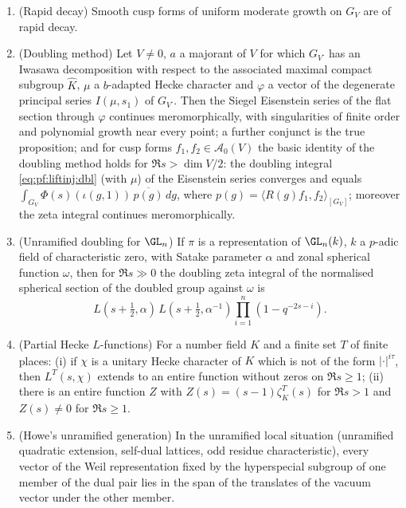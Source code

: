 \begin{littheorem}
\label{pf:liftinj:lit}
\begin{enumerate}[label=(\alph*)]
\item (Rapid decay) Smooth cusp forms of uniform moderate growth on $G_V$ are of rapid decay.
\item (Doubling method) Let $V\ne0$, $a$ a majorant of $V$ for which $G_{V^\square}$ has an Iwasawa decomposition with respect to the
associated maximal compact subgroup $\hat K$, $\mu$ a $b$-adapted Hecke character and $\varphi$ a vector of the degenerate principal
series $I(\mu,s_1)$ of $G_{V^\square}$. Then the Siegel Eisenstein series of the flat section through $\varphi$ continues
meromorphically, with singularities of finite order and polynomial growth near every point; a further conjunct is the true
proposition; and for cusp forms $f_1,f_2\in\mathcal A_0(V)$ the basic identity of the doubling method holds for $\Re s>\dim V/2$: the
doubling integral \eqref{eq:pf:liftinj:dbl} (with $\mu$) of the Eisenstein series converges and equals
$\int_{G_V}\Phi(s)(\iota(g,1))\,\overline{p(g)}\,dg$, where $p(g)=\langle R(g)f_1,f_2\rangle_{[G_V]}$; moreover the zeta integral
continues meromorphically.
\item (Unramified doubling for $\GL_n$) If $\pi$ is a representation of $\GL_n(k)$, $k$ a $p$-adic field of characteristic zero, with
Satake parameter $\alpha$ and zonal spherical function $\omega$, then for $\Re s\gg0$ the doubling zeta integral of the normalised
spherical section of the doubled group against $\omega$ is
\[
L(s+\tfrac12,\alpha)\,L(s+\tfrac12,\alpha^{-1})\prod_{i=1}^{n}(1-q^{-2s-i}).
\]
\item (Partial Hecke $L$-functions) For a number field $K$ and a finite set $T$ of finite places: (i) if $\chi$ is a unitary Hecke character
of $K$ which is not of the form $|\cdot|^{i\tau}$, then $L^T(s,\chi)$ extends to an entire function without zeros on $\Re s\ge1$; (ii)
there is an entire function $Z$ with $Z(s)=(s-1)\zeta_K^T(s)$ for $\Re s>1$ and $Z(s)\ne0$ for $\Re s\ge1$.
\item (Howe's unramified generation) In the unramified local situation (unramified quadratic extension, self-dual lattices, odd residue
characteristic), every vector of the Weil representation fixed by the hyperspecial subgroup of one member of the dual pair lies in the
span of the translates of the vacuum vector under the other member.
\end{enumerate}
\end{littheorem}

